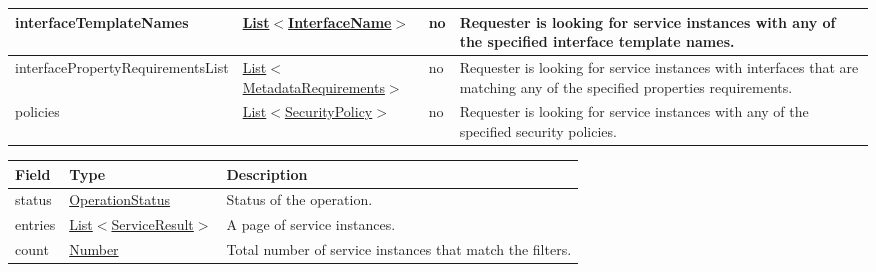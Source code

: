 \documentclass[a4paper]{arrowhead}
\newcommand{\pref}[1]{{\textcolor{ArrowheadGrey}{\hyperref[sec:model:primitives:#1]{#1}}}}
\begin{document}
\begin{table}[ht!]
\begin{tabularx}{\textwidth}{| p{5.6cm} | p{4.9cm} | p{2cm} | X |} \hline
interfaceTemplateNames &  \pref{List}$<$\pref{InterfaceName}$>$ & no & Requester is looking for service ins\-tances with any of the specified interface template names. \\ \hline
interfacePropertyRequirementsList & \pref{List}$<$\hyperref[sec:model:MetadataRequirements]{MetadataRequirements}$>$ & no & Requester is looking for service ins\-tances with interfaces that are matching any of the specified pro\-perties requirements.  \\ \hline
policies &  \pref{List}$<$\pref{SecurityPolicy}$>$ & no & Requester is looking for service ins\-tances with any of the specified security policies. \\ \hline
\end{tabularx}
\end{table}


\begin{table}[ht!]
\begin{tabularx}{\textwidth}{| p{2.5cm} | p{3.5cm} | X |} \hline
\rowcolor{gray!33} Field & Type      & Description \\ \hline
status & \pref{OperationStatus} & Status of the operation. \\ \hline
entries & \pref{List}$<$\hyperref[sec:model:ServiceResult]{ServiceResult}$>$ & A page of service instances. \\ \hline
count & \pref{Number} & Total number of service instances that match the filters. \\ \hline
\end{tabularx}
\end{table}

 
\end{document}
